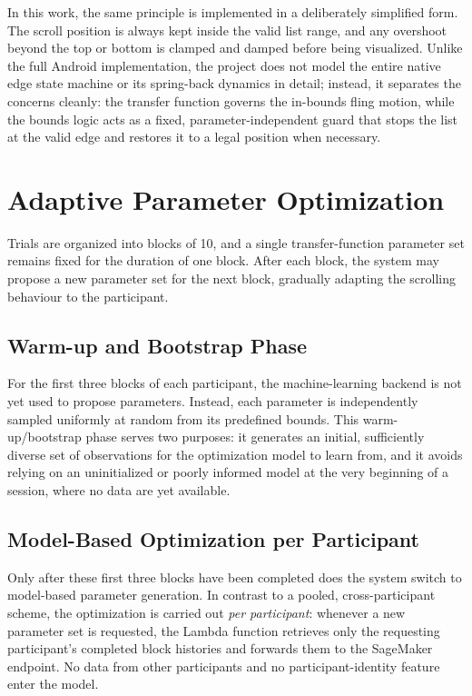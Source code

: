 \documentclass[12pt,a4paper]{report}
\begin{document}
        In this work, the same principle is implemented in a deliberately simplified form. The scroll position is always kept inside the valid list range, and any overshoot beyond the top or bottom is clamped and damped before being visualized. Unlike the full Android implementation, the project does not model the entire native edge state machine or its spring-back dynamics in detail; instead, it separates the concerns cleanly: the transfer function governs the in-bounds fling motion, while the bounds logic acts as a fixed, parameter-independent guard that stops the list at the valid edge and restores it to a legal position when necessary.

        \section{Adaptive Parameter Optimization}

        Trials are organized into blocks of 10, and a single transfer-function parameter set remains fixed for the duration of one block. After each block, the system may propose a new parameter set for the next block, gradually adapting the scrolling behaviour to the participant.

        \subsection{Warm-up and Bootstrap Phase}

        For the first three blocks of each participant, the machine-learning backend is not yet used to propose parameters. Instead, each parameter is independently sampled uniformly at random from its predefined bounds. This warm-up/bootstrap phase serves two purposes: it generates an initial, sufficiently diverse set of observations for the optimization model to learn from, and it avoids relying on an uninitialized or poorly informed model at the very beginning of a session, where no data are yet available.

        \subsection{Model-Based Optimization per Participant}

        Only after these first three blocks have been completed does the system switch to model-based parameter generation. In contrast to a pooled, cross-participant scheme, the optimization is carried out \emph{per participant}: whenever a new parameter set is requested, the Lambda function retrieves only the requesting participant's completed block histories and forwards them to the SageMaker endpoint. No data from other participants and no participant-identity feature enter the model.
\end{document}
